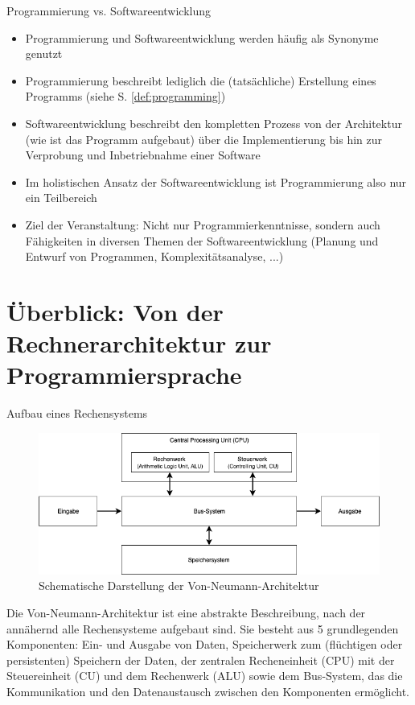      \begin{frame}{Programmierung vs. Softwareentwicklung}
    
        \begin{itemize}
            \item Programmierung und Softwareentwicklung werden häufig als Synonyme genutzt
            \item Programmierung beschreibt lediglich die (tatsächliche) Erstellung eines Programms (siehe S. \ref{def:programming})
            \item Softwareentwicklung beschreibt den kompletten Prozess von der Architektur (wie ist das Programm aufgebaut) über die Implementierung bis hin zur Verprobung und Inbetriebnahme einer Software
            \item Im holistischen Ansatz der Softwareentwicklung ist Programmierung also nur ein Teilbereich 
            \item Ziel der Veranstaltung: Nicht nur Programmierkenntnisse, sondern auch Fähigkeiten in diversen Themen der Softwareentwicklung (Planung und Entwurf von Programmen, Komplexitätsanalyse, ...)
            
        \end{itemize}
    \end{frame}
 

\section{Überblick: Von der Rechnerarchitektur zur Programmiersprache}

    \begin{frame}{Aufbau eines Rechensystems}
    
    \begin{figure}
        \centering
        \includegraphics[width=\linewidth,height=0.45\textheight,keepaspectratio]{chapters/03_programming/figures/von_neumann.png}
        \caption{Schematische Darstellung der Von-Neumann-Architektur}
        \label{fig:von_neumann}
    \end{figure}
    
    Die Von-Neumann-Architektur ist eine abstrakte Beschreibung, nach der annähernd alle Rechensysteme aufgebaut sind. Sie besteht aus 5 grundlegenden Komponenten: Ein- und Ausgabe von Daten, Speicherwerk zum (flüchtigen oder persistenten) Speichern der Daten, der zentralen Recheneinheit (CPU) mit der Steuereinheit (CU) und dem Rechenwerk (ALU) sowie dem Bus-System, das die Kommunikation und den Datenaustausch zwischen den Komponenten ermöglicht.
    
    \end{frame}
        

